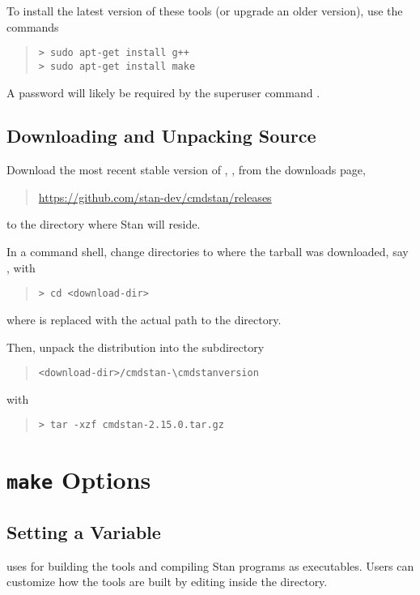 To install the latest version of these
tools (or upgrade an older version), use the commands
%
\begin{quote}
\begin{Verbatim}[fontshape=sl,fontsize=\small]
> sudo apt-get install g++ 
> sudo apt-get install make 
\end{Verbatim}
\end{quote}
% 
A password will likely be required by the superuser command .


\subsection{Downloading and Unpacking \CmdStan Source}

Download the most recent stable version of \CmdStan,
, from the \CmdStan downloads page,
%
\begin{quote}
\url{https://github.com/stan-dev/cmdstan/releases}
\end{quote}
%
to the directory where Stan will reside.

In a command shell, change directories to where the tarball was
downloaded, say , with
%
\begin{quote}
\begin{Verbatim}[fontshape=sl,fontsize=\small]
> cd <download-dir>
\end{Verbatim}
\end{quote}
%
where  is replaced with the actual path to the directory.

Then, unpack the distribution into the subdirectory
\begin{quote}
\nolinkurl{<download-dir>/cmdstan-\cmdstanversion}
\end{quote}
%
with
%
\begin{quote}
\begin{Verbatim}[fontshape=sl,fontsize=\small]
> tar -xzf cmdstan-2.15.0.tar.gz
\end{Verbatim}
\end{quote}


\section{{\tt make} Options}\label{make-options.appendix}

\subsection{Setting a Variable}
\CmdStan uses  for building the \CmdStan tools and
compiling Stan programs as executables. Users can customize how the
tools are built by editing  inside the
 directory.

